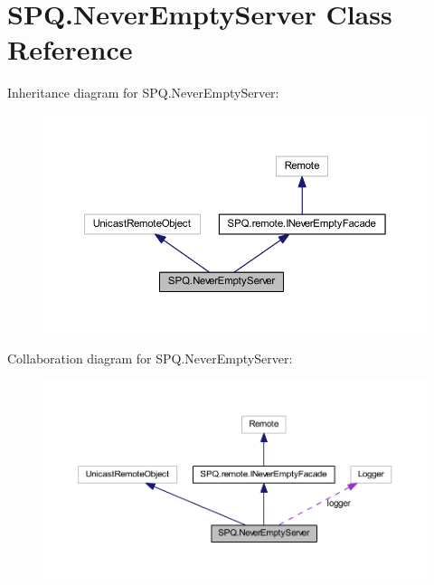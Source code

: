 \hypertarget{class_s_p_q_1_1_never_empty_server}{}\section{S\+P\+Q.\+Never\+Empty\+Server Class Reference}
\label{class_s_p_q_1_1_never_empty_server}


Inheritance diagram for S\+P\+Q.\+Never\+Empty\+Server\+:
\nopagebreak
\begin{figure}[H]
\begin{center}
\leavevmode
\includegraphics[width=350pt]{class_s_p_q_1_1_never_empty_server__inherit__graph}
\end{center}
\end{figure}


Collaboration diagram for S\+P\+Q.\+Never\+Empty\+Server\+:
\nopagebreak
\begin{figure}[H]
\begin{center}
\leavevmode
\includegraphics[width=350pt]{class_s_p_q_1_1_never_empty_server__coll__graph}
\end{center}
\end{figure}
